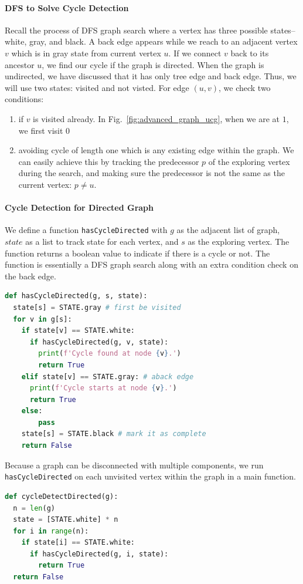 \documentclass[../main.tex]{subfiles}
\begin{document}
\paragraph{DFS to Solve Cycle Detection} Recall the process of DFS graph search where a vertex has three possible states--white, gray, and black. A back edge appears while we reach to an adjacent vertex $v$ which is in gray state from current vertex $u$. 
If we connect $v$ back to its ancestor $u$, we find our cycle if the graph is directed.  
When the graph is undirected, we have discussed that it has only tree edge and back edge. 
Thus, we will use two states: visited and not visted. For edge $(u, v)$, we check two conditions:
\begin{enumerate}
  \item if $v$ is visited already. In Fig.~\ref{fig:advanced_graph_ucg}, when we are at $1$, we first visit $0$
  \item avoiding cycle of length one which is any existing edge within the graph. 
We can easily achieve this by tracking the predecessor $p$ of the exploring vertex during the search, and making sure the predecessor is not the same as the current vertex: $p\neq u$. %
\end{enumerate}  

\paragraph{Cycle Detection for Directed Graph}  
We define a function \texttt{hasCycleDirected} with $g$ as the adjacent list of graph, $state$ as a list to track state for each vertex, and $s$ as the exploring vertex. The function returns a boolean value to indicate if there is a cycle or not. The function is essentially a DFS graph search along with an extra condition check on the back edge.  
\begin{lstlisting}[language=Python]
  def hasCycleDirected(g, s, state):
  state[s] = STATE.gray # first be visited
  for v in g[s]:
    if state[v] == STATE.white:
      if hasCycleDirected(g, v, state):
        print(f'Cycle found at node {v}.')
        return True
    elif state[v] == STATE.gray: # aback edge
      print(f'Cycle starts at node {v}.')
      return True
    else:
        pass
    state[s] = STATE.black # mark it as complete
    return False
\end{lstlisting}
Because a graph can be disconnected with multiple components, we run \texttt{hasCycleDirected} on each unvisited vertex within the graph in a main function.
\begin{lstlisting}[language=Python]
  def cycleDetectDirected(g):
  n = len(g)
  state = [STATE.white] * n
  for i in range(n):
    if state[i] == STATE.white:
      if hasCycleDirected(g, i, state):
        return True
  return False
\end{lstlisting}
\end{document}
